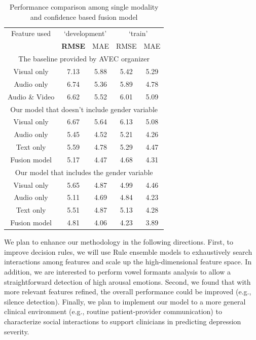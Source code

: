 \documentclass[letterpaper]{article} %
\begin{document}
\begin{table}[thp]
\caption{Performance comparison among single modality and confidence based fusion model}
\centering
\label{tab:perf_fusion}
\begin{tabular}{  c| c c | c c }
\hline
Feature used & \multicolumn{2}{c}{`development'} & \multicolumn{2}{c}{`train'} \\
& \textbf{RMSE} & MAE & RMSE & MAE \\
\hline \hline
\multicolumn{5}{c}{The baseline provided by AVEC organizer} \\
\hline
Visual only & 7.13 & 5.88 & 5.42 & 5.29 \\
Audio only & 6.74 & 5.36 & 5.89 & 4.78 \\
Audio \& Video & 6.62 & 5.52 & 6.01 & 5.09 \\
\hline
\multicolumn{5}{c}{Our model that doesn't include gender variable} \\
\hline
Visual only & 6.67 & 5.64 & 6.13 & 5.08 \\
Audio only & 5.45 & 4.52 & 5.21 & 4.26 \\
Text only & 5.59 & 4.78 & 5.29 & 4.47 \\
Fusion model & 5.17 & 4.47 & 4.68 & 4.31 \\
\hline
\multicolumn{5}{c}{Our model that includes the gender variable} \\
\hline
Visual only & 5.65 & 4.87 & 4.99 & 4.46 \\
Audio only & 5.11 & 4.69 & 4.84 & 4.23 \\
Text only & 5.51 & 4.87 & 5.13 & 4.28 \\
Fusion model & 4.81 & 4.06 & 4.23 & 3.89 \\
\hline
\end{tabular}
\end{table}

\vspace{-3.46mm}
We plan to enhance our methodology in the following directions. First, to improve decision rules, we will use Rule ensemble models to exhaustively search interactions among features and scale up the high-dimensional feature space. In addition, we are interested to perform vowel formants analysis to allow a straightforward detection of high arousal emotions. Second, we found that with more relevant features refined, the overall performance could be improved (e.g.,  silence detection). Finally, we plan to implement our model to a more general clinical environment (e.g., routine patient-provider communication) to characterize social interactions to support clinicians in predicting depression severity.
\end{document}
